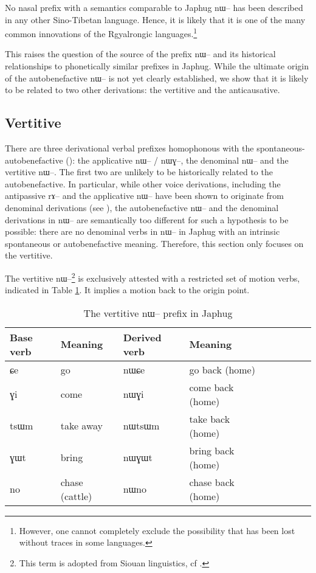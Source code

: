 \documentclass[oldfontcommands,oneside,a4paper,11pt]{article}
\newcommand{\ipa}[1]{{\phon \mbox{#1}}} %
\begin{document}
No nasal prefix with a semantics comparable to Japhug \ipa{nɯ--} has been described in any other Sino-Tibetan language. Hence, it is likely that it is one of the many common innovations of the Rgyalrongic languages.\footnote{However, one cannot completely exclude the possibility that has been lost without traces in some languages.} 

This raises the question of the source of the prefix \ipa{nɯ--} and its historical relationships to phonetically similar prefixes in Japhug. While the ultimate origin of the autobenefactive \ipa{nɯ--} is not yet clearly established, we show that it is likely to be related to two other derivations: the vertitive and the anticausative.



\subsection{Vertitive}
There are three derivational verbal prefixes homophonous with the spontaneous-autobenefactive (\citealt{jacques13tropative}): the applicative \ipa{nɯ--} / \ipa{nɯɣ--}, the denominal \ipa{nɯ--} and the vertitive \ipa{nɯ--}. The first two are unlikely to be historically related to the autobenefactive. In particular, while other voice derivations, including the antipassive \ipa{rɤ--} and the applicative \ipa{nɯ--}  have been shown to originate from denominal derivations (see \citealt{jacques14antipassive}), the autobenefactive \ipa{nɯ--} and the denominal derivations in \ipa{nɯ--} are semantically too different for such a hypothesis to be possible: there are no denominal verbs in \ipa{nɯ--}  in Japhug with an intrinsic spontaneous or autobenefactive meaning. Therefore, this section only focuses on the vertitive.

The vertitive \ipa{nɯ--}\footnote{This term is adopted from Siouan linguistics, cf \citet{taylor76motion}.} is exclusively attested with a restricted set of motion verbs, indicated in Table \ref{tab:vertitive}. It implies a motion back to the origin point.
 
\begin{table}[h]
\caption{The vertitive \ipa{nɯ--} prefix in Japhug} \centering \label{tab:vertitive}
\begin{tabular}{lllllllll}
\toprule
Base verb & Meaning & Derived verb & Meaning& \\
\midrule
\ipa{ɕe} & go & \ipa{nɯɕe} & go back (home) & \\
\ipa{ɣi} & come & \ipa{nɯɣi} & come back (home)& \\
\ipa{tsɯm} & take away & \ipa{nɯtsɯm} & take back  (home)& \\
\ipa{ɣɯt} & bring & \ipa{nɯɣɯt} & bring back  (home)& \\
\ipa{no} & chase (cattle) & \ipa{nɯno} & chase back  (home)& \\
\bottomrule
\end{tabular}
\end{table}
\end{document}
